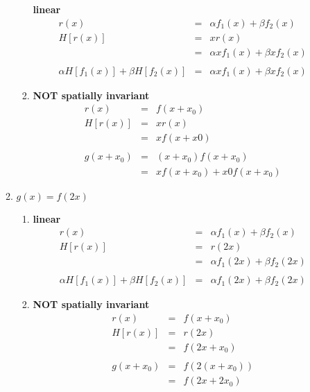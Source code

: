 \documentclass[9pt]{article}
\begin{document}
\begin{enumerate}
\begin{enumerate}
\begin{enumerate}
            \textbf{linear}
            \begin{eqnarray*}
              r(x) &=& \alpha f_1(x) + \beta f_2(x) \\
              H[r(x)] &=& x r(x) \\
                      &=& \alpha x f_1(x) + \beta x f_2(x) \\
              \\
              \alpha H[f_1(x)] + \beta H[f_2(x)]
                      &=& \alpha x f_1(x) + \beta x f_2(x)
            \end{eqnarray*}
          \item
            \textbf{NOT spatially invariant}
            \begin{eqnarray*}
              r(x) &=& f(x + x_0) \\
              H[r(x)] &=& x r(x) \\
                      &=& x f(x + x0) \\
              \\
              g(x + x_0) &=& (x + x_0) f(x + x_0) \\
                         &=& x f(x + x_0) + x0 f(x + x_0)
            \end{eqnarray*}
          \end{enumerate}
        \item
          $ g(x) = f(2x) $
          \begin{enumerate}
          \item
            \textbf{linear}
            \begin{eqnarray*}
              r(x) &=& \alpha f_1(x) + \beta f_2(x) \\
              H[r(x)] &=& r(2x) \\
                      &=& \alpha f_1(2x) + \beta f_2(2x) \\
              \\
              \alpha H[f_1(x)] + \beta H[f_2(x)]
                      &=& \alpha f_1(2x) + \beta f_2(2x)
            \end{eqnarray*}
          \item
            \textbf{NOT spatially invariant}
            \begin{eqnarray*}
              r(x) &=& f(x + x_0) \\
              H[r(x)] &=& r(2x) \\
                      &=& f(2x + x_0) \\
              \\
              g(x + x_0) &=& f(2(x + x_0)) \\
                         &=& f(2x + 2x_0)
            \end{eqnarray*}
          \end{enumerate}
      \end{enumerate}
  \end{enumerate}
\end{document}
